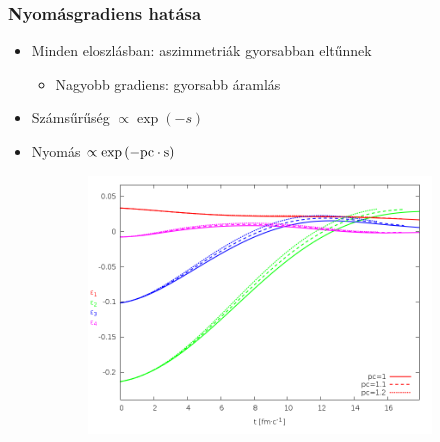 \documentclass{beamer}
\begin{document}
\begin{frame}
\begin{center}
\begin{figure}[H]
\begin{subfigure}[b]{0.49\textwidth}
	\end{subfigure}
\end{figure}
\end{center}
\end{frame}

\begin{frame}
\frametitle{Nyomásgradiens hatása}
\begin{center}
\begin{itemize}
\setlength{\itemsep}{12pt}
\item<1-> Minden eloszlásban: aszimmetriák gyorsabban eltűnnek
\begin{itemize}
\vspace{8pt}
\item<1-> Nagyobb gradiens: gyorsabb áramlás
\end{itemize}
\item<1-> Számsűrűség $\propto \exp{(-s)}$
\item<1-> Nyomás $\propto \exp{(-\rm{pc}\cdot s)}$
\end{itemize}
\begin{figure}[H]
	\centering
    \begin{subfigure}[b]{0.49\textwidth}
    		\includegraphics[width=\textwidth]{pic/res/rel/eps_pc_n}
	\end{subfigure}
	\begin{subfigure}[b]{0.49\textwidth}

\end{subfigure}
\end{figure}
\end{center}
\end{frame}
\end{document}
